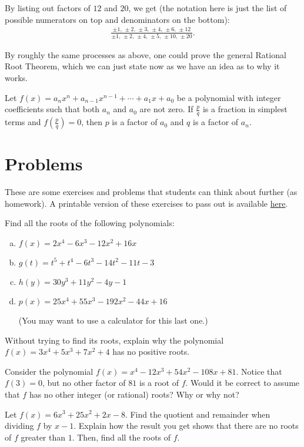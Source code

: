 By listing out factors of $12$ and $20$, we get (the notation here is just the list of possible numerators on top and denominators on the bottom):
\begin{align*}
    \frac{\pm 1,\, \pm 2,\, \pm 3,\, \pm 4,\, \pm 6,\, \pm 12}{\pm 1,\, \pm 2,\, \pm 4,\, \pm 5,\, \pm 10,\, \pm 20}.
\end{align*}

By roughly the same processes as above, one could prove the general Rational Root Theorem, which we can just state now as we have an idea as to why it works.
\begin{theorem}
    Let $f(x) = a_n x^n + a_{n-1} x^{n-1} + \cdots + a_1 x + a_0$ be a polynomial with integer coefficients such that both $a_n$ and $a_0$ are not zero. If $\frac{p}{q}$ is a fraction in simplest terms and $f\left(\frac{p}{q}\right) = 0$, then $p$ is a factor of $a_0$ and $q$ is a factor of $a_n$.
\end{theorem}

\section{Problems}

These are some exercises and problems that students can think about further (as homework). A printable version of these exercises to pass out is available \href{https://github.com/KlebbtheKlari/EPSY-201-Lesson-Plans/blob/main/extra/9pset.pdf}{here}.

\begin{problem}
    Find all the roots of the following polynomials:
    \begin{enumerate}[(a)]
        \item $f(x) = 2x^4-6x^3-12x^2+16x$
        \item $g(t) = t^5+t^4-6t^3-14t^2-11t-3$
        \item $h(y) = 30y^3+11y^2-4y-1$
        \item $p(x) = 25x^4+55x^3-192x^2-44x+16$ 
        
        (You may want to use a calculator for this last one.)
    \end{enumerate}
\end{problem}

\begin{problem}
    Without trying to find its roots, explain why the polynomial $f(x) = 3x^4 + 5x^3 + 7x^2 + 4$ has no positive roots.
\end{problem}

\begin{problem}
    Consider the polynomial $f(x) = x^4 - 12x^3 + 54x^2 - 108x + 81$. Notice that $f(3) = 0$, but no other factor of $81$ is a root of $f$. Would it be correct to assume that $f$ has no other integer (or rational) roots? Why or why not?
\end{problem}

\begin{problem}
    Let $f(x) = 6x^3+25x^2+2x-8$. Find the quotient and remainder when dividing $f$ by $x-1$. Explain how the result you get shows that there are no roots of $f$ greater than $1$. Then, find all the roots of $f$.
\end{problem}
